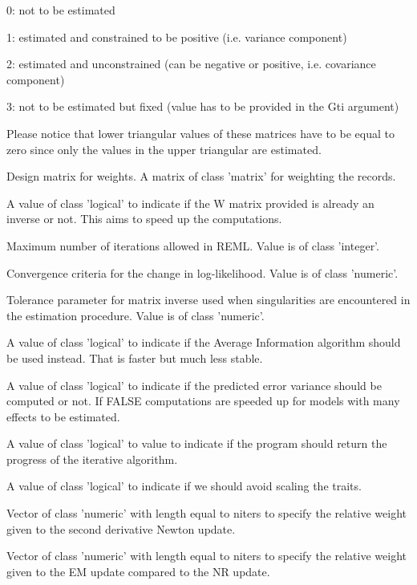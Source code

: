 \documentclass[a4paper]{book}
\begin{document}
\begin{Arguments}
\begin{ldescription}
0: not to be estimated

1: estimated and constrained to be positive (i.e. variance component)

2: estimated and unconstrained (can be negative or positive, i.e. covariance component)

3: not to be estimated but fixed (value has to be provided in the Gti argument)

Please notice that lower triangular values of these matrices have to be equal to zero since
only the values in the upper triangular are estimated.


\item[\code{W}] 
Design matrix for weights. A matrix of class 'matrix' for weighting the records.

\item[\code{isInvW}] 
A value of class 'logical' to indicate if the W matrix provided is already an inverse or
not. This aims to speed up the computations.

\item[\code{iters}] 
Maximum number of iterations allowed in REML. Value is of class 'integer'.

\item[\code{tolpar}] 
Convergence criteria for the change in log-likelihood. Value is of class 'numeric'.

\item[\code{tolparinv}] 
Tolerance parameter for matrix inverse used when singularities are encountered in
the estimation procedure. Value is of class 'numeric'.

\item[\code{ai}] 
A value of class 'logical' to indicate if the Average Information algorithm
should be used instead. That is faster but much less stable.

\item[\code{pev}] 
A value of class 'logical' to indicate if the predicted error variance should be 
computed or not. If FALSE computations are speeded up for models with many effects
to be estimated.

\item[\code{verbose}] 
A value of class 'logical' to value to indicate if the program should return
the progress of the iterative algorithm.

\item[\code{retscaled}] 
A value of class 'logical' to indicate if we should avoid scaling the traits.

\item[\code{stepweight}] 
Vector of class 'numeric' with length equal to niters to specify the relative weight
given to the second derivative Newton update.

\item[\code{emweight}] 
Vector of class 'numeric' with length equal to niters to specify the relative weight
given to the EM update compared to the NR update.



\end{ldescription}
\end{Arguments}
\end{document}
